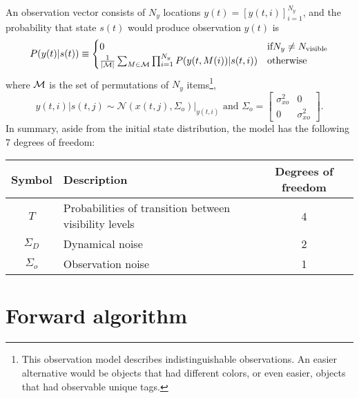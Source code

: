 \documentclass[12pt]{article}
\newcommand{\NormalE}[3]{{\mathcal{N}}\left.\left(#1,#2\right)\right|_{#3}}
\newcommand{\M}{{\cal M}}
\newcommand{\ti}[2]{{#1}{(#2)}}                         %
\newcommand{\ts}[4]{{\left[ #1(#2) \right]}_{#3}^{#4}} %
\begin{document}
An observation vector consists of $N_y$ locations
$\ti{y}{t}=\ts{y}{t,i}{i=1}{N_y}$, and the probability that state $\ti{s}{t}$
would produce observation $\ti{y}{t}$ is
\begin{equation}
  \label{eq:ob}
  P(\ti{y}{t}|\ti{s}{t}) \equiv
  \begin{cases}
    0 & \text{if} N_y \neq N_{\text{visible}} \\
    \frac{1}{\left|\M \right|} \sum_{M \in \M}
    \prod_{i=1}^{N_y} P(\ti{y}{t,M(i)}|\ti{s}{t,i}) & \text{otherwise}
  \end{cases}
\end{equation}
where $\M$ is the set of permutations of $N_y$ items\footnote{This
  observation model describes indistinguishable observations.  An
  easier alternative would be objects that had different colors, or
  even easier, objects that had observable unique tags.},
\begin{equation*}
  \ti{y}{t,i}|\ti{s}{t,j} \sim
  \NormalE{\ti{x}{t,j}}{\Sigma_o}{\ti{y}{t,i}} \text{ and }
  \Sigma_o = \begin{bmatrix} \sigma_{xo}^2 & 0 \\ 0 &
    \sigma_{xo}^2 \end{bmatrix}.
\end{equation*}
In summary, aside from the initial state distribution, the model has
the following 7 degrees of freedom:
\begin{center}
  \begin{tabular}{|cp{15em}c|}
    \hline
    Symbol & Description & Degrees of freedom \\
    \hline
    $T$ & Probabilities of transition between visibility levels & 4 \\
    $\Sigma_D$ & Dynamical noise & 2 \\
    $\Sigma_o$ & Observation noise & 1 \\
    \hline
  \end{tabular} 
\end{center}

\section{Forward algorithm}
\label{sec:forward}
\end{document}

